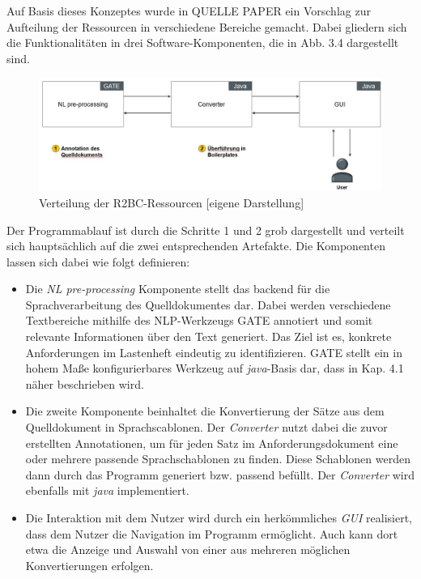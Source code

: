 \documentclass[12pt]{report}
\begin{document}
Auf Basis dieses Konzeptes wurde in QUELLE PAPER ein Vorschlag zur Aufteilung der Ressourcen in verschiedene Bereiche gemacht. Dabei gliedern sich die Funktionalitäten in drei Software-Komponenten, die in Abb. 3.4 dargestellt sind.
\begin{figure}[h!]
\begin{center}
\includegraphics[scale=0.5]{Bilder/Verteilung-R2BC.jpg}
\caption{Verteilung der R2BC-Ressourcen [eigene Darstellung]}
\end{center}
\end{figure}
Der Programmablauf ist durch die Schritte 1 und 2 grob dargestellt und verteilt sich hauptsächlich auf die zwei entsprechenden Artefakte. Die Komponenten lassen sich dabei wie folgt definieren:
\begin{itemize}
\item Die \textit{NL pre-processing} Komponente stellt das backend für die Sprachverarbeitung des Quelldokumentes dar. Dabei werden verschiedene Textbereiche mithilfe des NLP-Werkzeugs GATE annotiert und somit relevante Informationen über den Text generiert. Das Ziel ist es, konkrete Anforderungen im Lastenheft eindeutig zu identifizieren. GATE stellt ein in hohem Maße konfigurierbares Werkzeug auf \textit{java}-Basis dar, dass in Kap. 4.1 näher beschrieben wird.
\item Die zweite Komponente beinhaltet die Konvertierung der Sätze aus dem Quelldokument in Sprachscablonen. Der \textit{Converter} nutzt dabei die zuvor erstellten Annotationen, um für jeden Satz im Anforderungsdokument eine oder mehrere passende Sprachschablonen zu finden. Diese Schablonen werden dann durch das Programm generiert bzw. passend \glqq befüllt\grqq{}. Der \textit{Converter} wird ebenfalls mit \textit{java} implementiert.
\item Die Interaktion mit dem Nutzer wird durch ein herkömmliches \textit{GUI} realisiert, dass dem Nutzer die Navigation im Programm ermöglicht. Auch kann dort etwa die Anzeige und Auswahl von einer aus mehreren möglichen Konvertierungen erfolgen.
\end{itemize}
\end{document}
